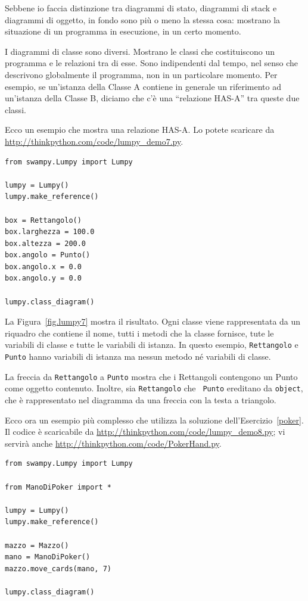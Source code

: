 \documentclass[10pt]{book}
\begin{document}
Sebbene io faccia distinzione tra diagrammi di stato, diagrammi di stack e diagrammi di oggetto, in fondo sono più o meno la stessa cosa: mostrano la situazione di un programma in esecuzione, in un certo momento.

I diagrammi di classe sono diversi. Mostrano le classi che costituiscono un programma e le relazioni tra di esse. Sono indipendenti dal tempo, nel senso che descrivono globalmente il programma, non in un particolare momento. Per esempio, se un'istanza della Classe A contiene in generale un riferimento ad un'istanza della Classe B, diciamo che c'è una ``relazione HAS-A'' tra queste due classi.

Ecco un esempio che mostra una relazione HAS-A. Lo potete scaricare da \url{http://thinkpython.com/code/lumpy_demo7.py}.

\begin{verbatim}
from swampy.Lumpy import Lumpy

lumpy = Lumpy()
lumpy.make_reference()

box = Rettangolo()
box.larghezza = 100.0
box.altezza = 200.0
box.angolo = Punto()
box.angolo.x = 0.0
box.angolo.y = 0.0

lumpy.class_diagram()
\end{verbatim}

La Figura~\ref{fig.lumpy7} mostra il risultato. Ogni classe viene rappresentata da un riquadro che contiene il nome, tutti i metodi che la classe fornisce, tute le variabili di classe e tutte le variabili di istanza. In questo esempio, {\tt Rettangolo} e {\tt Punto} hanno variabili di istanza ma nessun metodo né variabili di classe.

La freccia da {\tt Rettangolo} a {\tt Punto} mostra che i Rettangoli contengono un Punto come oggetto contenuto. Inoltre, sia {\tt Rettangolo} che {\tt
  Punto} ereditano da {\tt object}, che è rappresentato nel diagramma da una freccia con la testa a triangolo.

Ecco ora un esempio più complesso che utilizza la soluzione dell'Esercizio~\ref{poker}.
Il codice è scaricabile da  \url{http://thinkpython.com/code/lumpy_demo8.py};
vi servirà anche \url{http://thinkpython.com/code/PokerHand.py}.

\begin{verbatim}
from swampy.Lumpy import Lumpy

from ManoDiPoker import *

lumpy = Lumpy()
lumpy.make_reference()

mazzo = Mazzo()
mano = ManoDiPoker()
mazzo.move_cards(mano, 7)

lumpy.class_diagram()
\end{verbatim}
\end{document}
